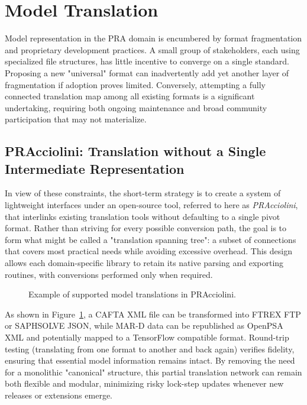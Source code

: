 \section{Model Translation}
Model representation in the PRA domain is encumbered by format fragmentation and proprietary development practices. A small group of stakeholders, each using specialized file structures, has little incentive to converge on a single standard. Proposing a new "universal" format can inadvertently add yet another layer of fragmentation if adoption proves limited. Conversely, attempting a fully connected translation map among all existing formats is a significant undertaking, requiring both ongoing maintenance and broad community participation that may not materialize.

\subsection{PRAcciolini: Translation without a Single Intermediate Representation}
In view of these constraints, the short-term strategy is to create a system of lightweight interfaces under an open-source tool, referred to here as \emph{PRAcciolini}, that interlinks existing translation tools without defaulting to a single pivot format. Rather than striving for every possible conversion path, the goal is to form what might be called a "translation spanning tree": a subset of connections that covers most practical needs while avoiding excessive overhead. This design allows each domain-specific library to retain its native parsing and exporting routines, with conversions performed only when required.

\begin{figure}[h!]
  
    \caption{Example of supported model translations in PRAcciolini.}
  \label{fig:translations}
\end{figure}

As shown in Figure~\ref{fig:translations}, a CAFTA XML file can be transformed into FTREX FTP or SAPHSOLVE JSON, while MAR-D data can be republished as OpenPSA XML and potentially mapped to a TensorFlow compatible format. Round-trip testing (translating from one format to another and back again) verifies fidelity, ensuring that essential model information remains intact. By removing the need for a monolithic "canonical" structure, this partial translation network can remain both flexible and modular, minimizing risky lock-step updates whenever new releases or extensions emerge.

